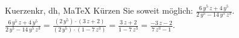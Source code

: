 \begin{MAufgabe}{Kuerzen}{kr, dh, MaTeX}
K\"urzen Sie soweit m\"oglich: $\frac{6\, y^5\, z + 4\, y^5}{2\, y^5 - 14\, y^5\, z^3}$.\\ 
\ifLsg\MLoesung
\quad $\frac{6\, y^5\, z + 4\, y^5}{2\, y^5 - 14\, y^5\, z^3}=\frac{(2\, y^5)\cdot(3\, z + 2)}{(2\, y^5)\cdot(1 - 7\, z^3)}=\frac{3\, z + 2}{1 - 7\, z^3}=\frac{ - 3\, z - 2}{7\, z^3 - 1}$.\else\relax\fi
 \end{MAufgabe}